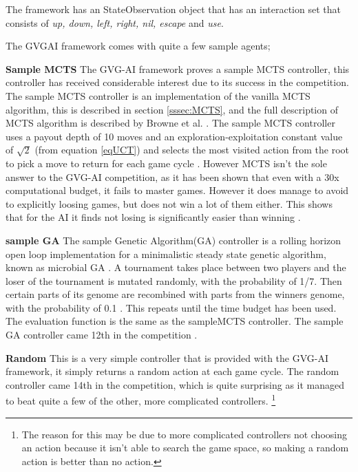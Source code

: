 \documentclass[journal]{IEEEtran}
\begin{document}
		
		The framework has an StateObservation object that has an interaction set that consists of \textit{up, down, left, right, nil, escape} and \textit{use}.

		The GVGAI framework comes with quite a few sample agents;
		
		\textbf{Sample MCTS} \label{sssec:sampleMCTS}
			The GVG-AI framework proves a sample MCTS controller, this controller has received considerable interest due to its success in the competition. 
			The sample MCTS controller is an implementation of the vanilla MCTS algorithm, this is described in section \ref{sssec:MCTS}, and the full description of MCTS algorithm is described by Browne et al. \cite{browne2012survey}.
			The sample MCTS controller uses a payout depth of 10 moves and an exploration-exploitation constant value of $\sqrt{2}$ (from equation \ref{eqUCT}) and selects the most visited action from the root to pick a move to return for each game cycle \cite{perez20162014}.
			However MCTS isn't the sole answer to the GVG-AI competition, as it has been shown that even with a 30x computational budget, it fails to master games. However it does manage to avoid to explicitly loosing games, but does not win a lot of them either. This shows that for the AI it finds not losing is significantly easier than winning \cite{nelson2016investigating}.

		\textbf{sample GA}
			The sample Genetic Algorithm(GA) controller is a rolling horizon open loop implementation for a minimalistic steady state genetic algorithm, known as microbial GA \cite{harvey2009microbial}.
			A tournament takes place between two players and the loser of the tournament is mutated randomly, with the probability of 1/7. Then certain parts of its genome are recombined with parts from the winners genome, with the probability of 0.1 \cite{perez20162014}. 
			This repeats until the time budget has been used. The evaluation function is the same as the sampleMCTS controller. 
			The sample GA controller came 12th in the competition \cite{perez20162014}.
			

		\textbf{Random}
			This is a very simple controller that is provided with the GVG-AI framework, it simply returns a random action at each game cycle.
			The random controller came 14th in the competition, which is quite surprising as it managed to beat quite a few of the other, more complicated controllers. \footnote{The reason for this may be due to more complicated controllers not choosing an action because it isn't able to search the game space, so making a random action is better than no action.}
\end{document}

